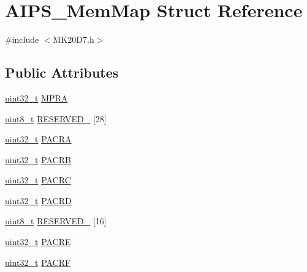 \hypertarget{struct_a_i_p_s___mem_map}{}\section{A\+I\+P\+S\+\_\+\+Mem\+Map Struct Reference}
\label{struct_a_i_p_s___mem_map}


{\ttfamily \#include $<$M\+K20\+D7.\+h$>$}

\subsection*{Public Attributes}
\begin{DoxyCompactItemize}
\item 
\hyperlink{_p_e___types_8h_a33594304e786b158f3fb30289278f5af}{uint32\+\_\+t} \hyperlink{struct_a_i_p_s___mem_map_a5ee5a8f31c77bbd35f1bb5f7a1f92c59}{M\+P\+RA}
\item 
\hyperlink{_p_e___types_8h_aba7bc1797add20fe3efdf37ced1182c5}{uint8\+\_\+t} \hyperlink{struct_a_i_p_s___mem_map_a67a1289be7ee7d3975df7d7c831b8819}{R\+E\+S\+E\+R\+V\+E\+D\+\_} \mbox{[}28\mbox{]}
\item 
\hyperlink{_p_e___types_8h_a33594304e786b158f3fb30289278f5af}{uint32\+\_\+t} \hyperlink{struct_a_i_p_s___mem_map_a4b1afda7928f39099d6cc26a0b17da11}{P\+A\+C\+RA}
\item 
\hyperlink{_p_e___types_8h_a33594304e786b158f3fb30289278f5af}{uint32\+\_\+t} \hyperlink{struct_a_i_p_s___mem_map_aa6897cc68c3e0e6bff51c421049ba3f4}{P\+A\+C\+RB}
\item 
\hyperlink{_p_e___types_8h_a33594304e786b158f3fb30289278f5af}{uint32\+\_\+t} \hyperlink{struct_a_i_p_s___mem_map_acbd09d77313ec522210dbcabec37c9f5}{P\+A\+C\+RC}
\item 
\hyperlink{_p_e___types_8h_a33594304e786b158f3fb30289278f5af}{uint32\+\_\+t} \hyperlink{struct_a_i_p_s___mem_map_a98bd3ff2455e9fccb9cd7d06cc090370}{P\+A\+C\+RD}
\item 
\hyperlink{_p_e___types_8h_aba7bc1797add20fe3efdf37ced1182c5}{uint8\+\_\+t} \hyperlink{struct_a_i_p_s___mem_map_a2cfc1f79520a66cb581e575c8606fd3b}{R\+E\+S\+E\+R\+V\+E\+D\+\_} \mbox{[}16\mbox{]}
\item 
\hyperlink{_p_e___types_8h_a33594304e786b158f3fb30289278f5af}{uint32\+\_\+t} \hyperlink{struct_a_i_p_s___mem_map_ad1f2d4b98aea7609a045558a9dc20f7b}{P\+A\+C\+RE}
\item 
\hyperlink{_p_e___types_8h_a33594304e786b158f3fb30289278f5af}{uint32\+\_\+t} \hyperlink{struct_a_i_p_s___mem_map_aedfe0bcf944c983903be902a97a1f59a}{P\+A\+C\+RF}

\end{DoxyCompactItemize}

